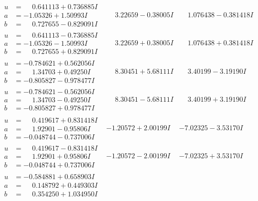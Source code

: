 \documentclass[1p]{elsarticle_modified}
\theoremstyle{definition}
\begin{document}
$$\begin{array}{c|c|c}
\begin{aligned}
u &= \phantom{-}0.641113 + 0.736885 I \\
a &= -1.05326 + 1.50993 I \\
b &= \phantom{-}0.727655 - 0.829091 I\end{aligned}
 & \phantom{-}3.22659 - 0.38005 I & \phantom{-}1.076438 - 0.381418 I \\ \hline\begin{aligned}
u &= \phantom{-}0.641113 - 0.736885 I \\
a &= -1.05326 - 1.50993 I \\
b &= \phantom{-}0.727655 + 0.829091 I\end{aligned}
 & \phantom{-}3.22659 + 0.38005 I & \phantom{-}1.076438 + 0.381418 I \\ \hline\begin{aligned}
u &= -0.784621 + 0.562056 I \\
a &= \phantom{-}1.34703 + 0.49250 I \\
b &= -0.805827 - 0.978477 I\end{aligned}
 & \phantom{-}8.30451 + 5.68111 I & \phantom{-}3.40199 - 3.19190 I \\ \hline\begin{aligned}
u &= -0.784621 - 0.562056 I \\
a &= \phantom{-}1.34703 - 0.49250 I \\
b &= -0.805827 + 0.978477 I\end{aligned}
 & \phantom{-}8.30451 - 5.68111 I & \phantom{-}3.40199 + 3.19190 I \\ \hline\begin{aligned}
u &= \phantom{-}0.419617 + 0.831418 I \\
a &= \phantom{-}1.92901 - 0.95806 I \\
b &= -0.048744 - 0.737006 I\end{aligned}
 & -1.20572 + 2.00199 I & -7.02325 - 3.53170 I \\ \hline\begin{aligned}
u &= \phantom{-}0.419617 - 0.831418 I \\
a &= \phantom{-}1.92901 + 0.95806 I \\
b &= -0.048744 + 0.737006 I\end{aligned}
 & -1.20572 - 2.00199 I & -7.02325 + 3.53170 I \\ \hline\begin{aligned}
u &= -0.584881 + 0.658903 I \\
a &= \phantom{-}0.148792 + 0.449303 I \\
b &= \phantom{-}0.354250 + 1.034950 I\end{aligned}

\end{array}$$
\end{document}
